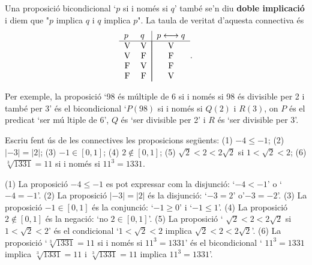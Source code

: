 Una proposici\'{o} bicondicional `$p$ si i nom\'{e}s si $q$' tamb\'{e} se'n
diu \textbf{doble implicaci\'{o}} i diem que "$p$ implica $q$ i $q$ implica $%
p$". La taula de veritat d'aquesta connectiva \'{e}s%
\begin{equation*}
\begin{tabular}{ll|l}
$p$ & $q$ & $p\longleftrightarrow q$ \\ \hline
\multicolumn{1}{c}{V} & \multicolumn{1}{c|}{V} & \multicolumn{1}{|c}{V} \\
\multicolumn{1}{c}{V} & \multicolumn{1}{c|}{F} & \multicolumn{1}{|c}{F} \\
\multicolumn{1}{c}{F} & \multicolumn{1}{c|}{V} & \multicolumn{1}{|c}{F} \\
\multicolumn{1}{c}{F} & \multicolumn{1}{c|}{F} & \multicolumn{1}{|c}{V}%
\end{tabular}
\text{.}
\end{equation*}

Per exemple, la proposici\'{o} `98 \'{e}s m\'{u}ltiple de 6 si i nom\'{e}s
si 98 \'{e}s divisible per 2 i tamb\'{e} per 3' \'{e}s el bicondicional `$%
P(98)$ si i nom\'{e}s si $Q(2)$ i $R(3)$, on $P$ \'{e}s el predicat `ser m\'{u}%
ltiple de 6', $Q$ \'{e}s `ser divisible per 2' i $R$ \'{e}s `ser divisible
per 3'.

\begin{exemple}
Escriu fent \'{u}s de les connectives les proposicions seg\"{u}ents: (1) $%
-4\leq-1$; (2) $\left\vert -3\right\vert =\left\vert 2\right\vert $; (3) $%
-1\in\left[ 0,1\right] $; (4) $2\notin\left[ 0,1\right] $; (5) $\sqrt {2}<2<2%
\sqrt{2}$ si $1<\sqrt{2}<2$; (6) $\sqrt[3]{1331}=11$ si i nom\'{e}s si $%
11^{3}=1331$.
\end{exemple}

\begin{solucio}
(1) La proposici\'{o} $-4\leq-1$ es pot expressar com la disjunci\'{o}: `$%
-4<-1$' o `$-4=-1$'. (2) La proposici\'{o} $\left\vert -3\right\vert
=\left\vert 2\right\vert $ \'{e}s la disjunci\'{o}: `$-3=2$' o'$-3=-2$'. (3)
La proposici\'{o} $-1\in\left[ 0,1\right] $ \'{e}s la conjunci\'{o}: `$%
-1\geq0$' i `$-1\leq1$'. (4) La proposici\'{o} $2\notin\left[ 0,1\right] $
\'{e}s la negaci\'{o}: `no $2\in\left[ 0,1\right] $'. (5) La proposici\'{o} `%
$\sqrt{2}<2<2\sqrt{2}$ si $1<\sqrt{2}<2$' \'{e}s el condicional `$1<\sqrt {2}%
<2$ implica $\sqrt{2}<2<2\sqrt{2}$'. (6) La proposici\'{o} `$\sqrt[3]{1331}%
=11$ si i nom\'{e}s si $11^{3}=1331$' \'{e}s el bicondicional ` $11^{3}=1331$
implica $\sqrt[3]{1331}=11$ i $\sqrt[3]{1331}=11$ implica $11^{3}=1331$'.
\end{solucio}

